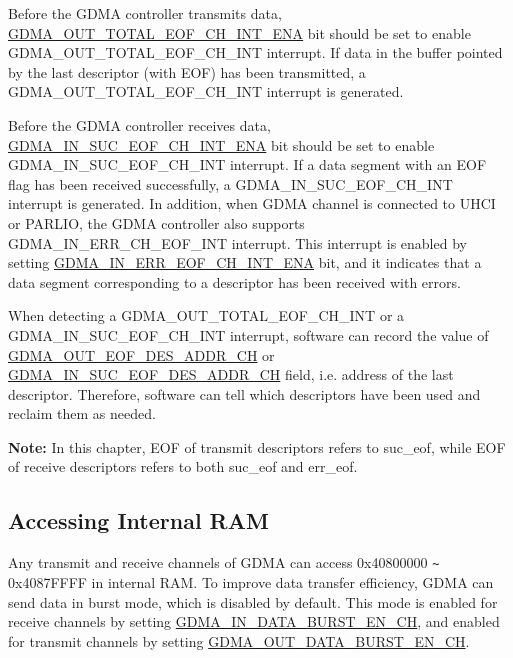 \documentclass[main\_\_EN.tex]{subfiles}
\begin{document}
Before the GDMA controller transmits data, \hyperref[fielddesc:GDMAOUTTOTALEOFCHNINTENA]{GDMA\_OUT\_TOTAL\_EOF\_CH\_INT\_ENA} bit should be set to enable GDMA\_OUT\_TOTAL\_EOF\_CH\_INT interrupt. If data in the buffer pointed by the last descriptor (with EOF) has been transmitted, a GDMA\_OUT\_TOTAL\_EOF\_CH\_INT interrupt is generated.

Before the GDMA controller receives data, \hyperref[fielddesc:GDMAINSUCEOFCHNINTENA]{GDMA\_IN\_SUC\_EOF\_CH\_INT\_ENA} bit should be set to enable GDMA\_IN\_SUC\_EOF\_CH\_INT interrupt. If a data segment with an EOF flag has been received successfully, a GDMA\_IN\_SUC\_EOF\_CH\_INT interrupt is generated. In addition, when GDMA channel is connected to UHCI or PARLIO, the GDMA controller also supports GDMA\_IN\_ERR\_CH\_EOF\_INT interrupt. This interrupt is enabled by setting \hyperref[fielddesc:GDMAINERREOFCHNINTENA]{GDMA\_IN\_ERR\_EOF\_CH\_INT\_ENA} bit, and it indicates that a data segment corresponding to a descriptor has been received with errors.

When detecting a GDMA\_OUT\_TOTAL\_EOF\_CH\_INT or a GDMA\_IN\_SUC\_EOF\_CH\_INT interrupt, software can record the value of \hyperref[fielddesc:GDMAOUTEOFDESADDRCHN]{GDMA\_OUT\_EOF\_DES\_ADDR\_CH} or \hyperref[fielddesc:GDMAINSUCEOFDESADDRCHN]{GDMA\_IN\_SUC\_EOF\_DES\_ADDR\_CH} field, i.e. address of the last descriptor. Therefore, software can tell which descriptors have been used and reclaim them as needed.

{\bfseries Note: }In this chapter, EOF of transmit descriptors refers to suc\_eof, while EOF of receive descriptors refers to both suc\_eof and err\_eof.

\subsection{Accessing Internal RAM}\label{sec:dma-access-inter-ram}

Any transmit and receive channels of GDMA can access 0x40800000 \verb+~+ 0x4087FFFF in internal RAM. To improve data transfer efficiency, GDMA can send data in burst mode, which is disabled by default. This mode is enabled for receive channels by setting \hyperref[fielddesc:GDMAINDATABURSTENCHN]{GDMA\_IN\_DATA\_BURST\_EN\_CH}, and enabled for transmit channels by setting \hyperref[fielddesc:GDMAOUTDATABURSTENCHN]{GDMA\_OUT\_DATA\_BURST\_EN\_CH}.
\end{document}
